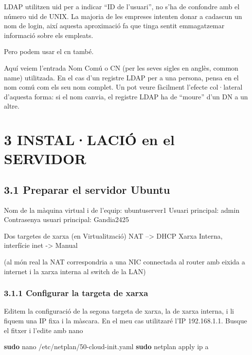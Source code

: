 \documentclass[
  12 pt,
  a4paper,
]{article}
\newenvironment{Shaded}{\begin{snugshade}}{\end{snugshade}}
\newcommand{\ExtensionTok}[1]{#1}
\newcommand{\FunctionTok}[1]{\textcolor[rgb]{0.13,0.29,0.53}{\textbf{#1}}}
\newcommand{\NormalTok}[1]{#1}
\begin{document}
LDAP utilitzen uid per a indicar ``ID de l'usuari'', no s'ha de
confondre amb el número uid de UNIX. La majoria de les empreses intenten
donar a cadascun un nom de login, així aquesta aproximació fa que tinga
sentit emmagatzemar informació sobre els empleats.

Pero podem usar el cn també.

Aquí veiem l'entrada Nom Comú o CN (per les seves sigles en anglès,
common name) utilitzada. En el cas d'un registre LDAP per a una persona,
pensa en el nom comú com els seu nom complet. Un pot veure fàcilment
l'efecte col·lateral d'aquesta forma: si el nom canvia, el registre LDAP
ha de ``moure'' d'un DN a un altre.

\section{3 INSTAL·LACIÓ en el
SERVIDOR}\label{installaciuxf3-en-el-servidor}

\subsection{3.1 Preparar el servidor
Ubuntu}\label{preparar-el-servidor-ubuntu}

Nom de la màquina virtual i de l'equip: ubuntuserver1 Usuari principal:
admin Contrasenya usuari principal: Gandia2425

Dos targetes de xarxa (en Virtualització) NAT --\textgreater{} DHCP
Xarxa Interna, interfície inet -\textgreater{} Manual

(al món real la NAT correspondria a una NIC connectada al router amb
eixida a internet i la xarxa interna al switch de la LAN)

\subsubsection{3.1.1 Configurar la targeta de
xarxa}\label{configurar-la-targeta-de-xarxa}

Editem la configuració de la segona targeta de xarxa, la de xarxa
interna, i li fiquem una IP fixa i la màscara. En el meu cas utilitzaré
l'IP 192.168.1.1. Busque el fitxer i l'edite amb nano

\begin{Shaded}
\begin{Highlighting}[]
\FunctionTok{sudo}\NormalTok{ nano /etc/netplan/50{-}cloud{-}init.yaml}
\FunctionTok{sudo}\NormalTok{ netplan apply}
\ExtensionTok{ip}\NormalTok{ a}
\end{Highlighting}
\end{Shaded}
\end{document}
